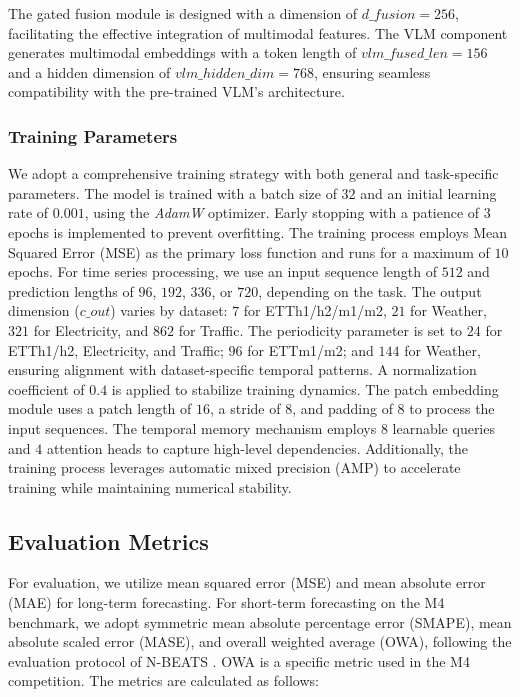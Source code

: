 The gated fusion module is designed with a dimension of $d\_fusion = 256$, facilitating the effective integration of multimodal features. The VLM component generates multimodal embeddings with a token length of $vlm\_fused\_len = 156$ and a hidden dimension of $vlm\_hidden\_dim = 768$, ensuring seamless compatibility with the pre-trained VLM's architecture.



\subsubsection{Training Parameters}
\label{appx:training_settings}

We adopt a comprehensive training strategy with both general and task-specific parameters. The model is trained with a batch size of $32$ and an initial learning rate of $0.001$, using the \textit{AdamW} optimizer. Early stopping with a patience of $3$ epochs is implemented to prevent overfitting. The training process employs Mean Squared Error (MSE) as the primary loss function and runs for a maximum of $10$ epochs. For time series processing, we use an input sequence length of $512$ and prediction lengths of $96$, $192$, $336$, or $720$, depending on the task. The output dimension ($c\_out$) varies by dataset: $7$ for ETTh1/h2/m1/m2, $21$ for Weather, $321$ for Electricity, and $862$ for Traffic. The periodicity parameter is set to $24$ for ETTh1/h2, Electricity, and Traffic; $96$ for ETTm1/m2; and $144$ for Weather, ensuring alignment with dataset-specific temporal patterns. A normalization coefficient of $0.4$ is applied to stabilize training dynamics. The patch embedding module uses a patch length of $16$, a stride of $8$, and padding of $8$ to process the input sequences. The temporal memory mechanism employs $8$ learnable queries and $4$ attention heads to capture high-level dependencies. Additionally, the training process leverages automatic mixed precision (AMP) to accelerate training while maintaining numerical stability.



\subsection{Evaluation Metrics}
\label{appx:evaluation_metric}

For evaluation, we utilize mean squared error (MSE) and mean absolute error (MAE) for long-term forecasting. For short-term forecasting on the M4 benchmark, we adopt symmetric mean absolute percentage error (SMAPE), mean absolute scaled error (MASE), and overall weighted average (OWA), following the evaluation protocol of N-BEATS \citep{oreshkin2019n}. OWA is a specific metric used in the M4 competition. The metrics are calculated as follows:

